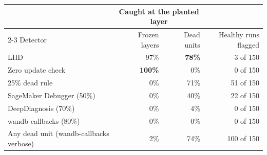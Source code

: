 \begin{tabular}{@{}lrrr@{}}
\toprule
 & \multicolumn{2}{c}{Caught at the planted layer} & \\
\cmidrule(lr){2-3}
Detector & Frozen layers & Dead units & Healthy runs flagged \\
\midrule
LHD & 97\% & \textbf{78\%} & 3 of 150 \\
Zero update check & \textbf{100\%} & 0\% & 0 of 150 \\
25\% dead rule & 0\% & 71\% & 51 of 150 \\
SageMaker Debugger (50\%) & 0\% & 40\% & 22 of 150 \\
DeepDiagnosis (70\%) & 0\% & 4\% & 0 of 150 \\
wandb-callbacks (80\%) & 0\% & 0\% & 0 of 150 \\
Any dead unit (wandb-callbacks verbose) & 2\% & 74\% & 100 of 150 \\
\bottomrule
\end{tabular}
